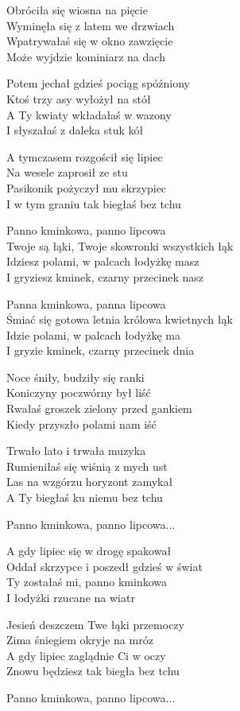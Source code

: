 \begin{textn}
    Obróciła się wiosna na pięcie\\
    Wyminęła się z latem we drzwiach\\
    Wpatrywałaś się w okno zawzięcie\\
    Może wyjdzie kominiarz na dach
        
    Potem jechał gdzieś pociąg spóźniony\\
    Ktoś trzy asy wyłożył na stół\\
    A Ty kwiaty wkładałaś w wazony\\
    I słyszałaś z daleka stuk kół
        
    A tymczasem rozgościł się lipiec\\
    Na wesele zaprosił ze stu\\
    Pasikonik pożyczył mu skrzypiec\\
    I w tym graniu tak biegłaś bez tchu
        
    \vin Panno kminkowa, panno lipcowa\\
    \vin Twoje są łąki, Twoje skowronki wszystkich łąk\\
    \vin Idziesz polami, w palcach łodyżkę masz\\
    \vin I gryziesz kminek, czarny przecinek nasz
        
    \vin Panna kminkowa, panna lipcowa\\
    \vin Śmiać się gotowa letnia królowa kwietnych łąk\\
    \vin Idzie polami, w palcach łodyżkę ma\\
    \vin I gryzie kminek, czarny przecinek dnia
        
    Noce śniły, budziły się ranki\\
    Koniczyny poczwórny był liść\\
    Rwałaś groszek zielony przed gankiem\\
    Kiedy przyszło polami nam iść
        
    Trwało lato i trwała muzyka\\
    Rumieniłaś się wiśnią z mych ust\\
    Las na wzgórzu horyzont zamykał\\
    A Ty biegłaś ku niemu bez tchu
        
    \vin Panno kminkowa, panno lipcowa...
        
    A gdy lipiec się w drogę spakował\\
    Oddał skrzypce i poszedł gdzieś w świat\\
    Ty zostałaś mi, panno kminkowa\\
    I łodyżki rzucane na wiatr
        
    Jesień deszczem Twe łąki przemoczy\\
    Zima śniegiem okryje na mróz\\
    A gdy lipiec zaglądnie Ci w oczy\\
    Znowu będziesz tak biegła bez tchu
        
    \vin Panno kminkowa, panno lipcowa...
\end{textn}
